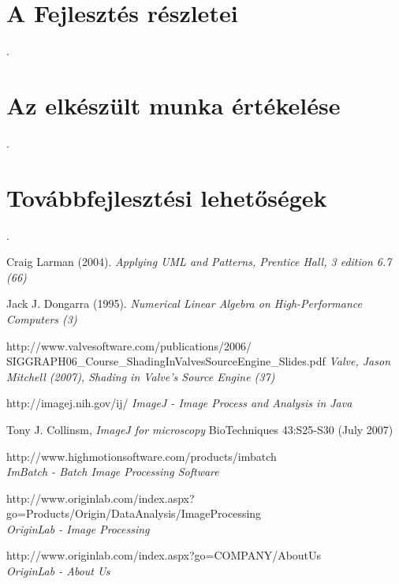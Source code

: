 \documentclass[a4paper,12pt,oneside]{report}
\begin{document}
\section{A Fejlesztés részletei}
.
\section{Az elkészült munka értékelése}
.
\section{Továbbfejlesztési lehetőségek}
.
%
%

\begin{thebibliography}{99}

		Craig Larman (2004). 
        {\em Applying UML and Patterns, Prentice Hall, 3 edition 6.7 (66)\\}

		Jack J. Dongarra (1995). 
        {\em Numerical Linear Algebra on High-Performance Computers (3)\\}
        
		http://www.valvesoftware.com/publications/2006/\\SIGGRAPH06\_Course\_ShadingInValvesSourceEngine\_Slides.pdf
        {\em Valve, Jason Mitchell (2007), Shading in Valve’s Source Engine  (37) \\}     
        
        

        http://imagej.nih.gov/ij/
        {\em ImageJ - Image Process and Analysis in Java}
        
		Tony J. Collinsm,
        {\em ImageJ for microscopy}
        BioTechniques 43:S25-S30 (July 2007)

        http://www.highmotionsoftware.com/products/imbatch\\
        {\em ImBatch - Batch Image Processing Software}

		http://www.originlab.com/index.aspx?go=Products/Origin/DataAnalysis/ImageProcessing\\
        {\em OriginLab - Image Processing}
        
        
        http://www.originlab.com/index.aspx?go=COMPANY/AboutUs\\
        {\em OriginLab - About Us}


\end{thebibliography}
\end{document}
